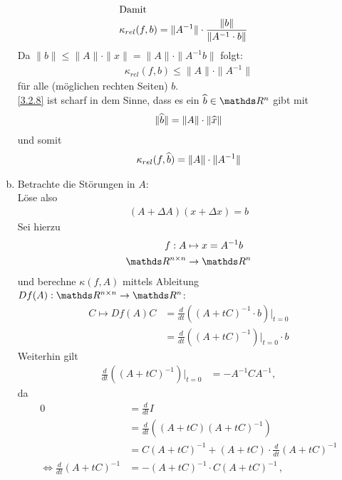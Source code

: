 \begin{Bspe}
\begin{enumerate}[a)]
\begin{align}
      \intertext{Damit}
      \kappa_{rel} (f,b) &= \|A^{-1} \| \cdot \frac{\|b\|}{\|A^{-1}\cdot b\|} \label{III.2.7}
    \end{align}
    Da $\|b\| \leq \|A\|\cdot\|x\| = \|A\|\cdot \|A^{-1}b\|$ folgt:
    \begin{gather}
      \kappa_{rel}(f,b) \leq \|A\| \cdot \|A^{-1}\| \label{III.2.8}
    \end{gather}
    für alle (möglichen rechten Seiten) $b $.\\
    \ref{3.2.8} ist scharf in dem Sinne, dass es ein $\widehat{b}\in \R^n$ gibt 
    mit 
    \begin{gather*}
      \|\widehat{b}\| = \left\| A \right\|\cdot \left\| \widehat{x} \right\|
    \end{gather*}
    und somit
    \begin{gather*}
      \kappa_{rel}(f,\widehat{b}) = \left\| A \right\|\cdot \| A^{-1}\|
    \end{gather*} %
  \item Betrachte die Störungen in $A$:\\
    Löse also 
    \begin{gather*}
      (A+\Delta A)(x+\Delta x) = b
    \end{gather*}
    Sei hierzu
    \begin{align*}
      f:A&\mapsto x= A^{-1}b \\
      \R^{n\times n}&\rightarrow \R^n
    \end{align*}
    und berechne $\kappa(f,A)$ mittels Ableitung $Df(A):\R^{n\times n} \rightarrow \R^n$:
    \begin{align*}
      C\mapsto Df(A) C&= \frac{d}{dt} \left((A+tC)^{-1} \cdot b\right) \Big\vert_{t=0} \\
                      & = \frac{d}{dt}\left((A+tC)^{-1}\right)\Big\vert_{t=0}\cdot b
    \end{align*}			
    Weiterhin gilt
    \begin{align}
      \frac{d}{dt} \left((A+tC)^{-1}\right) \Big\vert_{t=0} 
      &=-A^{-1}CA^{-1}, 
        \label{III.2.9}
    \end{align}
    da
    \begin{align*}
      0&= \frac{d}{dt}I \\
       &= \frac{d}{dt}\left( (A+tC)(A+tC)^{-1}\right)\\
       &= C(A+tC)^{-1} +(A+tC)\cdot \frac{d}{dt}(A+tC)^{-1} \\
      \Leftrightarrow \frac{d}{dt} (A+ tC)^{-1} 
       &= -(A+tC)^{-1} \cdot C(A+tC)^{-1} \, ,

\end{align*}
\end{enumerate}
\end{Bspe}
